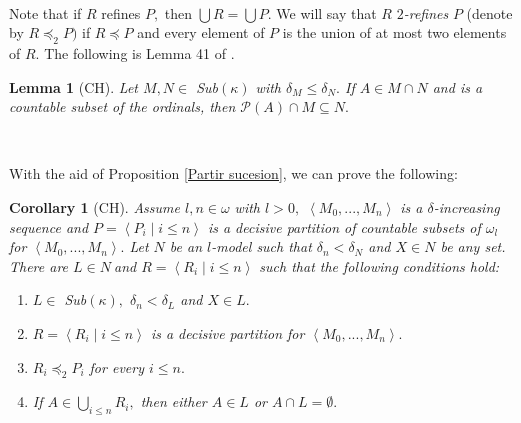 \documentclass{article}%
\newtheorem{corollary}[theorem]{Corollary}
\newtheorem{lemma}[theorem]{Lemma}
\begin{document}
\qquad\ \ \ \qquad\ \ \ 

Note that if $R$ refines $P,$ then $\bigcup R=\bigcup P.$ We will say that $R$
$2$\emph{-refines} $P$ (denote by $R\preceq_{2}P)$ if $R\preceq P$ and every
element of $P$ is the union of at most two elements of $R.$ The following is
Lemma 41 of \cite{UltrafiltersinRandomModel}.

\begin{lemma}
[\textsf{CH}]Let $M,N\in$ \textsf{Sub}$\left(  \kappa\right)  $ with
$\delta_{M}\leq\delta_{N}.$ If $A\in M\cap N$ and is a countable subset of the
ordinals, then $\mathcal{P}\left(  A\right)  \cap M\subseteq N.$
\label{Lema potencia contenida}
\end{lemma}

\qquad\ \ \ \ \ 

With the aid of Proposition \ref{Partir sucesion}, we can prove the following:

\begin{corollary}
[\textsf{CH}]Assume $l,n\in\omega$ with $l>0,$ $\left\langle M_{0}%
,...,M_{n}\right\rangle $ is a $\delta$-increasing sequence and
$P=\left\langle P_{i}\mid i\leq n\right\rangle $ is a decisive partition of
countable subsets of $\omega_{l}$ for $\left\langle M_{0},...,M_{n}%
\right\rangle .$ Let $N$ be an $l$-model such that $\delta_{n}<\delta_{N}$ and
$X\in N$ be any set. There are $L\in N\ $and $R=\left\langle R_{i}\mid i\leq
n\right\rangle $ such that the following conditions hold:
\label{Partir Particion}

\begin{enumerate}
\item $L\in$ \textsf{Sub}$\left(  \kappa\right)  ,$ $\delta_{n}<\delta_{L}$
and $X\in L.$

\item $R=\left\langle R_{i}\mid i\leq n\right\rangle $ is a decisive partition
for $\left\langle M_{0},...,M_{n}\right\rangle .$

\item $R_{i}\preceq_{2}P_{i}$ for every $i\leq n.$

\item If $A\in\bigcup\limits_{i\leq n}R_{i},$ then either $A\in L$ or $A\cap
L=\emptyset.$
\end{enumerate}
\end{corollary}
\end{document}
